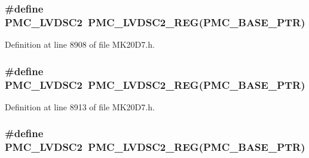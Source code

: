\subsubsection[{\texorpdfstring{P\+M\+C\+\_\+\+L\+V\+D\+S\+C2}{PMC_LVDSC2}}]{\setlength{\rightskip}{0pt plus 5cm}\#define P\+M\+C\+\_\+\+L\+V\+D\+S\+C2~{\bf P\+M\+C\+\_\+\+L\+V\+D\+S\+C2\+\_\+\+R\+EG}({\bf P\+M\+C\+\_\+\+B\+A\+S\+E\+\_\+\+P\+TR})}\hypertarget{group___p_m_c___register___accessor___macros_ga921b48d20e5bc7e7353ac2f59c8135ba}{}\label{group___p_m_c___register___accessor___macros_ga921b48d20e5bc7e7353ac2f59c8135ba}


Definition at line 8908 of file M\+K20\+D7.\+h.

\subsubsection[{\texorpdfstring{P\+M\+C\+\_\+\+L\+V\+D\+S\+C2}{PMC_LVDSC2}}]{\setlength{\rightskip}{0pt plus 5cm}\#define P\+M\+C\+\_\+\+L\+V\+D\+S\+C2~{\bf P\+M\+C\+\_\+\+L\+V\+D\+S\+C2\+\_\+\+R\+EG}({\bf P\+M\+C\+\_\+\+B\+A\+S\+E\+\_\+\+P\+TR})}\hypertarget{group___p_m_c___register___accessor___macros_ga921b48d20e5bc7e7353ac2f59c8135ba}{}\label{group___p_m_c___register___accessor___macros_ga921b48d20e5bc7e7353ac2f59c8135ba}


Definition at line 8913 of file M\+K20\+D7.\+h.

\subsubsection[{\texorpdfstring{P\+M\+C\+\_\+\+L\+V\+D\+S\+C2}{PMC_LVDSC2}}]{\setlength{\rightskip}{0pt plus 5cm}\#define P\+M\+C\+\_\+\+L\+V\+D\+S\+C2~{\bf P\+M\+C\+\_\+\+L\+V\+D\+S\+C2\+\_\+\+R\+EG}({\bf P\+M\+C\+\_\+\+B\+A\+S\+E\+\_\+\+P\+TR})}\hypertarget{group___p_m_c___register___accessor___macros_ga921b48d20e5bc7e7353ac2f59c8135ba}{}\label{group___p_m_c___register___accessor___macros_ga921b48d20e5bc7e7353ac2f59c8135ba}


